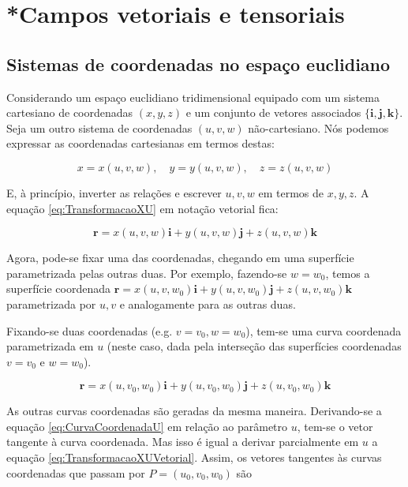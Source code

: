 \chapter{*Campos vetoriais e tensoriais}\label{cap:CamposVetoriaisETensoriais}
\section{Sistemas de coordenadas no espaço euclidiano}\label{sec:SistemasCoordenadasEspacoEuclideano}
Considerando um espaço euclidiano tridimensional equipado com um sistema cartesiano de coordenadas $ (x,y,z) $ e um conjunto de vetores associados $ \{\mathbf{i}, \mathbf{j}, \mathbf{k}\} $. Seja um outro sistema de coordenadas $ (u,v,w) $ não-cartesiano. Nós podemos expressar as coordenadas cartesianas em termos destas:

\begin{equation}\label{eq:TransformacaoXU}
	x=x(u, v, w), \quad y=y(u, v, w), \quad z=z(u, v, w)
\end{equation}
	
E, à princípio, inverter as relações e escrever $ u,v,w $ em termos de $ x,y,z $. A equação \eqref{eq:TransformacaoXU} em notação vetorial fica:

\begin{equation}\label{eq:TransformacaoXUVetorial}
\mathbf{r}=x(u, v, w) \mathbf{i}+y(u, v, w) \mathbf{j}+z(u, v, w) \mathbf{k}
\end{equation}

Agora, pode-se fixar uma das coordenadas, chegando em uma superfície parametrizada pelas outras duas. Por exemplo, fazendo-se $ w=w_0 $, temos a superfície coordenada $ \mathbf{r}=x\left(u, v, w_{0}\right) \mathbf{i}+y\left(u, v, w_{0}\right) \mathbf{j}+z\left(u, v, w_{0}\right) \mathbf{k} $ parametrizada por $ u,v $ e analogamente para as outras duas.

Fixando-se duas coordenadas (e.g. $ v=v_0,w=w_0 $), tem-se uma curva coordenada parametrizada em $ u $ (neste caso, dada pela interseção das superfícies coordenadas $ v=v_0 $ e $ w=w_0 $).

\begin{equation}\label{eq:CurvaCoordenadaU}
 \mathbf{r}=x\left(u, v_{0}, w_{0}\right) \mathbf{i}+y\left(u, v_{0}, w_{0}\right) \mathbf{j}+z\left(u, v_{0}, w_{0}\right) \mathbf{k} 
\end{equation}

As outras curvas coordenadas são geradas da mesma maneira. Derivando-se a equação \eqref{eq:CurvaCoordenadaU} em relação ao parâmetro $ u $, tem-se o vetor tangente à curva coordenada. Mas isso é igual a derivar parcialmente em $ u $ a equação \eqref{eq:TransformacaoXUVetorial}. Assim, os vetores tangentes às curvas coordenadas que passam por $ P=(u_0,v_0,w_0) $ são


